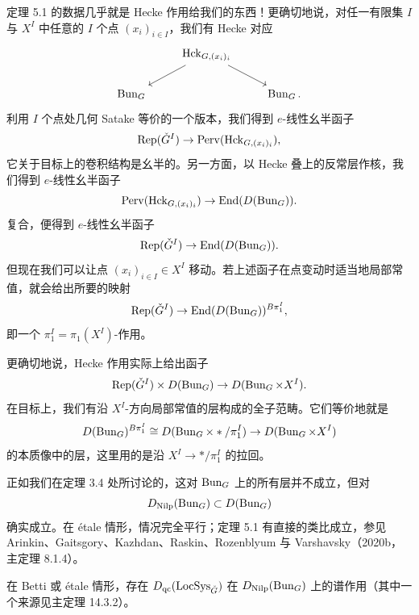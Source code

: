 定理 5.1 的数据几乎就是 Hecke 作用给我们的东西！更确切地说，对任一有限集 $I$ 与 $X^I$ 中任意的 $I$ 个点 $(x_i)_{i\in I}$，我们有 Hecke 对应
\[
\begin{tikzcd}
& \Hck_{G,(x_i)_i} \arrow[ld] \arrow[rd] & \\
\Bun_G & & \Bun_G.
\end{tikzcd}
\]
利用 $I$ 个点处几何 Satake 等价的一个版本，我们得到 $e$-线性幺半函子
\[
\operatorname{Rep}(\check{G}^I)\to\operatorname{Perv}(\operatorname{Hck}_{G,(x_i)_i}),
\]
它关于目标上的卷积结构是幺半的。另一方面，以 Hecke 叠上的反常层作核，我们得到 $e$-线性幺半函子
\[
\operatorname{Perv}(\operatorname{Hck}_{G,(x_i)_i})\to\operatorname{End}(D(\operatorname{Bun}_G)).
\]
复合，便得到 $e$-线性幺半函子
\[
\operatorname{Rep}(\check{G}^I)\to\operatorname{End}(D(\operatorname{Bun}_G)).
\]
但现在我们可以让点 $(x_i)_{i\in I}\in X^I$ 移动。若上述函子在点变动时适当地局部常值，就会给出所要的映射
\[
\operatorname{Rep}(\check{G}^I)\to\operatorname{End}(D(\operatorname{Bun}_G))^{B\pi_1^I},
\]
即一个 $\pi_1^I=\pi_1(X^I)$-作用。

更确切地说，Hecke 作用实际上给出函子
\[
\operatorname{Rep}(\check{G}^I)\times D(\operatorname{Bun}_G)\to D(\operatorname{Bun}_G\times X^I).
\]
在目标上，我们有沿 $X^I$-方向局部常值的层构成的全子范畴。它们等价地就是
\[
D(\operatorname{Bun}_G)^{B\pi_1^I}\cong D(\operatorname{Bun}_G\times\ast/\pi_1^I)\to D(\operatorname{Bun}_G\times X^I)
\]
的本质像中的层，这里用的是沿 $X^I\to\ast/\pi_1^I$ 的拉回。

正如我们在定理 3.4 处所讨论的，这对 $\operatorname{Bun}_G$ 上的所有层并不成立，但对
\[
D_{\mathrm{Nilp}}(\operatorname{Bun}_G)\subset D(\operatorname{Bun}_G)
\]
确实成立。在 étale 情形，情况完全平行；定理 5.1 有直接的类比成立，参见 Arinkin、Gaitsgory、Kazhdan、Raskin、Rozenblyum 与 Varshavsky（2020b，主定理 8.1.4）。

\begin{corollary}
在 Betti 或 étale 情形，存在 $D_{\mathrm{qc}}(\operatorname{LocSys}_{\check{G}})$ 在 $D_{\mathrm{Nilp}}(\operatorname{Bun}_G)$ 上的谱作用（其中一个来源见主定理 14.3.2）。
\end{corollary}

